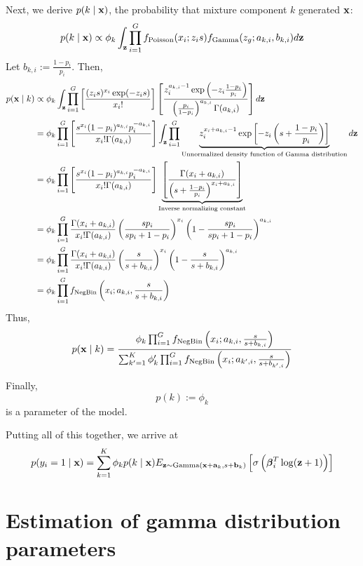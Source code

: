 Next, we derive $p(k \mid \bold{x})$, the probability that mixture component $k$ generated $\bold{x}$:
$$p(k \mid \bold{x}) \propto \phi_k \int_{\bold{z}}  \prod_{i=1}^G f_{\text{Poisson}}(x_i ; z_is)f_{\text{Gamma}}(z_g ; a_{k,i}, b_{k,i}) d\bold{z}$$
Let $b_{k,i} := \frac{1-p_i}{p_i}$.  Then,
\begin{align*}
p(\bold{x} \mid k) &\propto \phi_k \int_{\bold{z}} \prod_{i=1}^G \left[ \frac{ (z_is)^{x_i} \exp(-z_is) }{ x_i!} \right] \left[ \frac{   z_i^{a_{k,i} - 1} \exp\left(-z_i \frac{1-p_i}{p_i} \right)   }{  \left(\frac{p_i}{1-p_i}\right)^{a_{k,i}} \Gamma(a_{k,i})      } \right] d\bold{z} \\ 
&= \phi_k \prod_{i=1}^G \left[\frac{s^{x_i}(1-p_i)^{a_{k,i}} p_i^{-a_{k,i}} }{x_i!\Gamma(a_{k,i})}\right]  \int_{\bold{z}} \prod_{i=1}^G  \underbrace{z_i^{x_i + a_{k,i} -1} \exp\left[-z_i\left(s + \frac{1-p_i}{p_i}\right) \right]}_{\text{Unnormalized density function of Gamma distribution}} d\bold{z} \\
&= \phi_k \prod_{i=1}^G \left[ \frac{s^{x_i}(1-p_i)^{a_{k,i}} p_i^{-a_{k,i}} }{x_i!\Gamma(a_{k,i})}\right]   \underbrace{\left[ \frac{\Gamma(x_i + a_{k,i})}{\left(s + \frac{1-p_i}{p_i}\right)^{x_i+a_{k,i}}}\right]}_{\text{Inverse normalizing constant}} \\
&= \phi_k \prod_{i=1}^G \frac{\Gamma(x_i + a_{k,i}) }{x_i!\Gamma(a_{k,i})} \left(\frac{sp_i}{sp_i+1-p_i}\right)^{x_i} \left(1 - \frac{sp_i}{sp_i + 1 - p_i}\right)^{a_{k,i}} \\
&= \phi_k \prod_{i=1}^G \frac{\Gamma(x_i + a_{k,i}) }{x_i!\Gamma(a_{k,i})} \left(\frac{s}{s+b_{k,i}}\right)^{x_i} \left(1 - \frac{s}{s + b_{k,i}}\right)^{a_{k,i}} \\
&= \phi_k \prod_{i=1}^G f_{\text{NegBin}}\left(x_i ; a_{k,i}, \frac{s}{s + b_{k,i}}\right)
\end{align*}
Thus,
$$p(\bold{x} \mid k) = \frac{\phi_k \prod_{i=1}^G f_{\text{NegBin}}\left(x_i ; a_{k,i}, \frac{s}{s + b_{k,i}}\right)}{\sum_{k'=1}^K \phi_k' \prod_{i=1}^G f_{\text{NegBin}}\left(x_i ; a_{k',i}, \frac{s}{s + b_{k',i}}\right)}$$

 Finally, 
$$p(k) := \phi_k$$is a parameter of the model.  

Putting all of this together, we arrive at
$$p(y_i=1 \mid \bold{x}) = \sum_{k=1}^K \phi_k p(k \mid \bold{x}) E_{\bold{z} \sim \text{Gamma}(\bold{x} + \bold{a}_k, s + \bold{b}_k)} \left[\sigma\left(\boldsymbol{\beta}_i^T\log(\bold{z}+1)\right) \right]$$


\section{Estimation of gamma distribution parameters }


